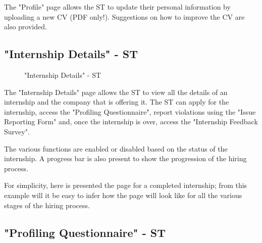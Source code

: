 \par The "Profile" page allows the ST to update their personal information by uploading a new CV (PDF only!).
Suggestions on how to improve the CV are also provided.

\subsection{"Internship Details" - ST}

\begin{figure}[H]
    \centering
    \caption{"Internship Details" - ST}
    \label{fig:internship-details-st}
\end{figure}

\par The "Internship Details" page allows the ST to view all the details of an internship and the company that is
offering it. The ST can apply for the internship, access the "Profiling Questionnaire", report violations using the
"Issue Reporting Form" and, once the internship is over, access the "Internship Feedback Survey".

\par The various functions are enabled or disabled based on the status of the internship. A progress bar is also
present to show the progression of the hiring process.

\par For simplicity, here is presented the page for a completed
internship; from this example will it be easy to infer how the page will look like for all the various stages of the
hiring process.

\subsection{"Profiling Questionnaire" - ST}
\label{subsec:profiling-questionnaire-st}%

